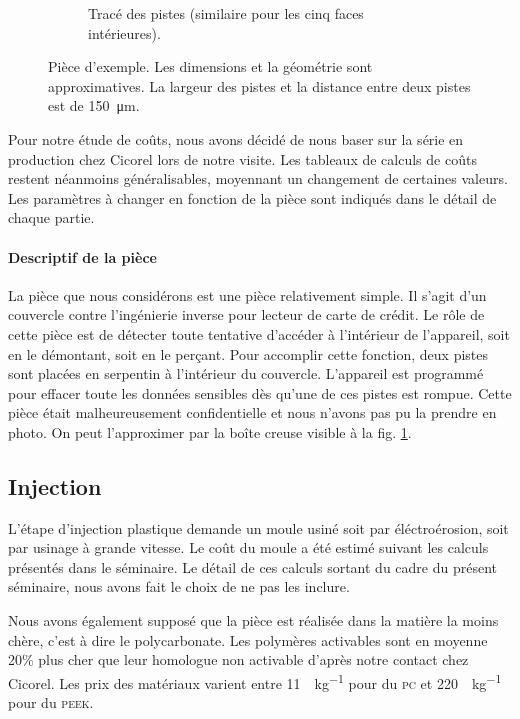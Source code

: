 \begin{figure}[h]
\begin{subfigure}[t]{0.4\textwidth}
                \caption{Tracé des pistes (similaire pour les cinq faces intérieures).}
        \end{subfigure}

        \caption{Pièce d'exemple. Les dimensions et la géométrie sont approximatives. La largeur des pistes et la distance entre deux pistes est de \SI{150}{\micro\meter}.}
        \label{fig:example-part}
\end{figure}
Pour notre étude de coûts, nous avons décidé de nous baser sur la série en production chez Cicorel lors de notre visite.
Les tableaux de calculs de coûts restent néanmoins généralisables, moyennant un changement de certaines valeurs.
Les paramètres à changer en fonction de la pièce sont indiqués dans le détail de chaque partie.


\paragraph{Descriptif de la pièce}
La pièce que nous considérons est une pièce relativement simple.
Il s'agit d'un couvercle contre l'ingénierie inverse pour lecteur de carte de crédit.
Le rôle de cette pièce est de détecter toute tentative d'accéder à l'intérieur de l'appareil, soit en le démontant, soit en le perçant.
Pour accomplir cette fonction, deux pistes sont placées en serpentin à l'intérieur du couvercle.
L'appareil est programmé pour effacer toute les données sensibles dès qu'une de ces pistes est rompue.
Cette pièce était malheureusement confidentielle et nous n'avons pas pu la prendre en photo.
On peut l'approximer par la boîte creuse visible à la fig. \ref{fig:example-part}.


\subsection{Injection}

L'étape d'injection plastique demande un moule usiné soit par éléctroérosion, soit par usinage à grande vitesse.
Le coût du moule a été estimé suivant les calculs présentés dans le séminaire\cite{electroerosion-2013}.
Le détail de ces calculs sortant du cadre du présent séminaire, nous avons fait le choix de ne pas les inclure. 

Nous avons également supposé que la pièce est réalisée dans la matière la moins chère, c'est à dire le polycarbonate.
Les polymères activables sont en moyenne 20\% plus cher que leur homologue non activable d'après notre contact chez Cicorel.
Les prix des matériaux varient entre \SI{11}{\chf\per\kilogram} pour du \textsc{pc} et \SI{220}{\chf\per\kilogram} pour du \textsc{peek}.

